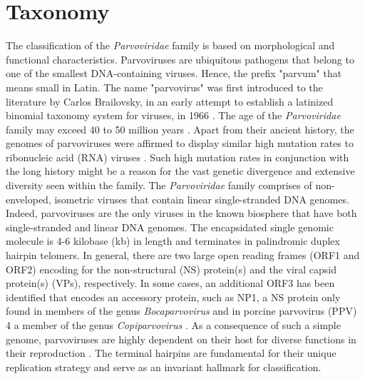 
\chapter{Taxonomy} %

\label{Chapter2} %





\label{sec:Taxonomy}
The classification of the \textit{Parvoviridae} family is based on morphological and functional characteristics. Parvoviruses are ubiquitous pathogens that belong to one of the smallest DNA-containing viruses. Hence, the prefix "parvum" that means small in Latin. The name "parvovirus" was first introduced to the literature by Carlos Brailovsky, in an early attempt to establish a latinized binomial taxonomy system for viruses, in 1966 \cite{pmid5902774}. The age of the \textit{Parvoviridae} family may exceed 40 to 50 million years \cite{pmid20861255}. Apart from their ancient history, the genomes of parvoviruses were affirmed to display similar high mutation rates to ribonucleic acid (RNA) viruses \cite{pmid1649336, pmid12716974, pmid10411508, pmid16537636, pmid15626758, pmid21795474}. Such high mutation rates in conjunction with the long history might be a reason for the vast genetic divergence and extensive diversity seen within the family.      
The \textit{Parvoviridae} family comprises of non-enveloped, isometric viruses that contain linear single-stranded DNA genomes. Indeed, parvoviruses are the only viruses in the known biosphere that have both single-stranded and linear DNA genomes. The encapsidated single genomic molecule is 4-6 kilobase (kb) in length and terminates in palindromic duplex hairpin telomers. In general, there are two large open reading frames (ORF1 and ORF2) encoding for the non-structural (NS) protein(s) and the viral capsid protein(s) (VPs), respectively. In some cases, an additional ORF3 has been identified that encodes an accessory protein, such as NP1, a NS protein only found in members of the genus \textit{Bocaparvovirus} and in porcine parvovirus (PPV) 4 a member of the genus \textit{Copiparvovirus} \cite{pmid6319731, pmid21049037, pmid20339886}. As a consequence of such a simple genome, parvoviruses are highly dependent on their host for diverse functions in their reproduction \cite{pmid3296697, pmid10497831}. The terminal hairpins are fundamental for their unique replication strategy and serve as an invariant hallmark for classification.
